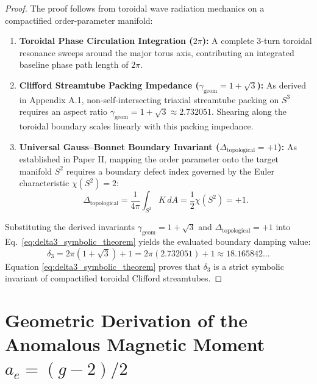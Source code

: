 \documentclass[11pt,a4paper]{article}
\begin{document}
	\begin{proof}
		The proof follows from toroidal wave radiation mechanics on a compactified order-parameter manifold:
		\begin{enumerate}
			\item \textbf{Toroidal Phase Circulation Integration ($2\pi$):} A complete $3$-turn toroidal resonance sweeps around the major torus axis, contributing an integrated baseline phase path length of $2\pi$.
			\item \textbf{Clifford Streamtube Packing Impedance ($\gamma_{\text{geom}} = 1 + \sqrt{3}$):} As derived in Appendix A.1, non-self-intersecting triaxial streamtube packing on $S^3$ requires an aspect ratio $\gamma_{\text{geom}} = 1 + \sqrt{3} \approx 2.732051$. Shearing along the toroidal boundary scales linearly with this packing impedance.
			\item \textbf{Universal Gauss--Bonnet Boundary Invariant ($\Delta_{\text{topological}} = +1$):} As established in Paper II, mapping the order parameter onto the target manifold $S^2$ requires a boundary defect index governed by the Euler characteristic $\chi(S^2) = 2$:
			\begin{equation}
				\Delta_{\text{topological}} = \frac{1}{4\pi} \int_{S^2} K \, dA = \frac{1}{2} \chi(S^2) = +1.
			\end{equation}
		\end{enumerate}
		Substituting the derived invariants $\gamma_{\text{geom}} = 1 + \sqrt{3}$ and $\Delta_{\text{topological}} = +1$ into Eq.\ \eqref{eq:delta3_symbolic_theorem} yields the evaluated boundary damping value:
		\begin{equation}
			\delta_3 = 2\pi(1 + \sqrt{3}) + 1 = 2\pi(2.732051) + 1 \approx 18.165842\dots
			\label{eq:delta3_numerical_eval}
		\end{equation}
		Equation \eqref{eq:delta3_symbolic_theorem} proves that $\delta_3$ is a strict symbolic invariant of compactified toroidal Clifford streamtubes.
	\end{proof}
	
	\section{Geometric Derivation of the Anomalous Magnetic Moment $a_e = (g-2)/2$}
	\label{app:g_minus_2_derivation}
	
\end{document}
